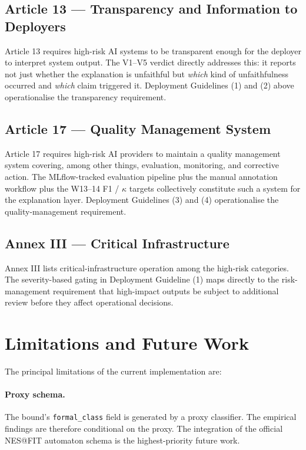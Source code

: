 \subsection{Article 13 — Transparency and Information to Deployers}
\label{subsec:eu-article-13}
Article 13 requires high-risk AI systems to be transparent enough for the
deployer to interpret system output. The V1--V5 verdict directly addresses
this: it reports not just whether the explanation is unfaithful but
\emph{which} kind of unfaithfulness occurred and \emph{which} claim
triggered it. Deployment Guidelines (1) and (2) above operationalise the
transparency requirement.

\subsection{Article 17 — Quality Management System}
\label{subsec:eu-article-17}
Article 17 requires high-risk AI providers to maintain a quality
management system covering, among other things, evaluation, monitoring,
and corrective action. The MLflow-tracked evaluation pipeline plus the
manual annotation workflow plus the W13--14 F1 / $\kappa$ targets
collectively constitute such a system for the explanation layer.
Deployment Guidelines (3) and (4) operationalise the quality-management
requirement.

\subsection{Annex III — Critical Infrastructure}
\label{subsec:eu-annex-iii}
Annex III lists critical-infrastructure operation among the high-risk
categories. The severity-based gating in Deployment Guideline (1) maps
directly to the risk-management requirement that high-impact outputs be
subject to additional review before they affect operational decisions.

\section{Limitations and Future Work}
\label{sec:discussion-future}

The principal limitations of the current implementation are:

\paragraph{Proxy schema.} The bound's \texttt{formal\_class} field is
generated by a proxy classifier. The empirical findings are therefore
conditional on the proxy. The integration of the official NES@FIT
automaton schema is the highest-priority future work.

